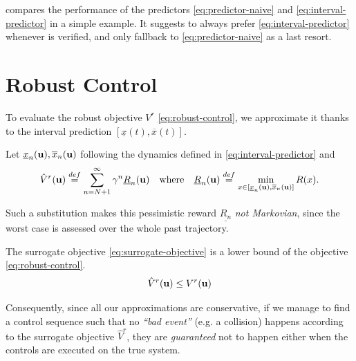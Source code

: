 \documentclass{article}
\begin{document}
 compares the performance of the predictors \eqref{eq:predictor-naive} and \eqref{eq:interval-predictor} in a simple example. It suggests to always prefer \eqref{eq:interval-predictor} whenever  is verified, and only fallback to \eqref{eq:predictor-naive} as a last resort.


\section{Robust Control}

\label{sec:control}
To evaluate the robust objective $V^r$ \eqref{eq:robust-control}, we approximate it thanks to the interval prediction $[\underline{x}(t), \overline{x}(t)]$.

\begin{definition}
	Let $\underline{x}_n(\mathbf{u}), \overline{x}_n(\mathbf{u})$ following the dynamics defined in \eqref{eq:interval-predictor} and
\begin{equation}
\label{eq:surrogate-objective} 
\hat{V}^r(\bu) \eqdef \sum_{n=N+1}^\infty \gamma^n \underline{R}_n(\bu)\quad\text{where}\quad\underline{R}_n(\bu) \eqdef \min_{x\in[\underline{x}_n(\bu), \overline{x}_n(\bu)]}  R(x). %
\end{equation}
\end{definition}
Such a substitution makes this pessimistic reward $\underline{R_n}$ \emph{not Markovian}, since the worst case is assessed over the whole past trajectory.

\begin{theorem}
\label{prop:lower-bound}
The surrogate objective  \eqref{eq:surrogate-objective} is a lower bound of the objective  \eqref{eq:robust-control}.
\begin{equation*}
\hat{V}^r(\mathbf{u}) \leq V^r(\mathbf{u})
\end{equation*}
\end{theorem}
Consequently, since all our approximations are conservative, if we manage to find a control sequence such that no \textit{``bad event''} (e.g. a collision) happens according to the surrogate objective $\hat{V}^r$, they are \emph{guaranteed} not to happen either when the controls are executed on the true system. 
\end{document}
